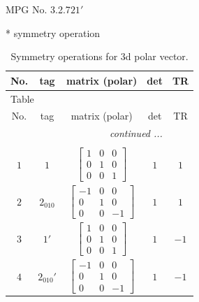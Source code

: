 \documentclass[fleqn,8pt]{jsarticle}
\begin{document}
\setcounter{MaxMatrixCols}{32}

\renewcommand{\tablename}{Table~}
\renewcommand{\figurename}{Figure~}
\begin{center}
\LARGE
MPG No. 3.2.7\quad$21'$
\end{center}
* symmetry operation
\renewcommand{\arraystretch}{1.3}
\begin{longtable}{ccccc}
\caption{Symmetry operations for 3d polar vector.}
 \\
 \hline \hline
No. & tag & matrix (polar) & det & TR \\ \hline \endfirsthead

\multicolumn{4}{l}{\tablename\ \thetable{}} \\
 \hline \hline
No. & tag & matrix (polar) & det & TR \\ \hline \endhead

 \hline \hline
\multicolumn{4}{r}{\footnotesize\it continued ...} \\ \endfoot

 \hline \hline
\multicolumn{4}{r}{} \\ \endlastfoot

$ 1 $ & $ 1 $ & $ \begin{bmatrix} 1 & 0 & 0 \\ 0 & 1 & 0 \\ 0 & 0 & 1 \end{bmatrix} $ & $ 1 $ & $ 1 $ \\ \hline
$ 2 $ & $ 2{}_{010} $ & $ \begin{bmatrix} -1 & 0 & 0 \\ 0 & 1 & 0 \\ 0 & 0 & -1 \end{bmatrix} $ & $ 1 $ & $ 1 $ \\ \hline
$ 3 $ & $ 1{}' $ & $ \begin{bmatrix} 1 & 0 & 0 \\ 0 & 1 & 0 \\ 0 & 0 & 1 \end{bmatrix} $ & $ 1 $ & $ -1 $ \\ \hline
$ 4 $ & $ 2{}_{010}{}' $ & $ \begin{bmatrix} -1 & 0 & 0 \\ 0 & 1 & 0 \\ 0 & 0 & -1 \end{bmatrix} $ & $ 1 $ & $ -1 $ \\
\end{longtable}
\end{document}
